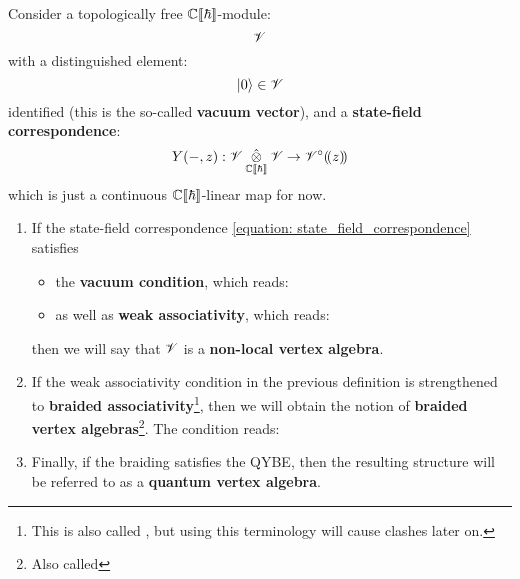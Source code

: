         \begin{definition} \label{def: formal_quantum_vertex_algebras}
            Consider a topologically free $\mathbb{C}[\![\hbar]\!]$-module:
                $$\mathscr{V}$$
            with a distinguished element:
                $$\lvert {0} \rangle \in \mathscr{V}$$
            identified (this is the so-called \textbf{vacuum vector}), and a \textbf{state-field correspondence}:
            \begin{equation} \label{equation: state_field_correspondence}
                Y(-, z): \scrV \hattensor_{\bbC[\![\hbar]\!]} \scrV \to \scrV^{\circ}(\!(z)\!)
            \end{equation}
            which is just a continuous $\mathbb{C}[\![\hbar]\!]$-linear map for now.
            \begin{enumerate}
                \item If the state-field correspondence \eqref{equation: state_field_correspondence} satisfies \:
                \begin{itemize}
                    \item the \textbf{vacuum condition}, which reads:
                    \item as well as \textbf{weak associativity}, which reads:
                \end{itemize}
                then we will say that $\mathscr{V}$ is a \textbf{non-local vertex algebra}.
                
                
                \item If the weak associativity condition in the previous definition is strengthened to \textbf{braided associativity}\footnote{This is also called , but using this terminology will cause clashes later on.}, then we will obtain the notion of \textbf{braided vertex algebras}\footnote{Also called }. The condition reads:
                
                
                \item Finally, if the braiding satisfies the QYBE, then the resulting structure will be referred to as a \textbf{quantum vertex algebra}.
                
                
            \end{enumerate}
        \end{definition}


